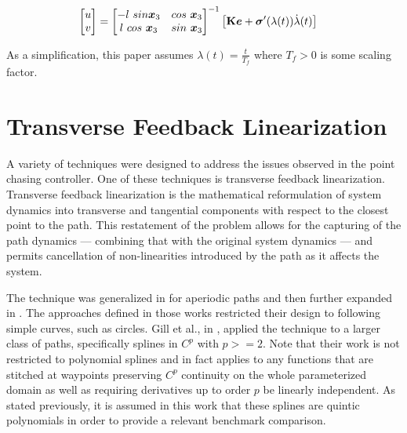 \documentclass[oneside, 11pt]{book}
\begin{document}
\begin{align*}
    \begin{bmatrix}
        u \\ v
    \end{bmatrix}   &=  \begin{bmatrix}
                            -l~sin\bm{x}_3 & cos~\bm{x}_3 \\
                            l~cos~\bm{x}_3 & sin~\bm{x}_3 \\
                        \end{bmatrix}^{-1}
                        \left[
                            \mathbf{K}\bm{e} + \bm{\sigma}'(\lambda(t))\dot{\lambda}(t)
                        \right]
\end{align*}

As a simplification, this paper assumes $\lambda(t)=\frac{t}{T_f}$ where $T_f > 0$ is some scaling factor.

\section{Transverse Feedback Linearization}
A variety of techniques were designed to address the issues observed in the point chasing controller. One of these techniques is transverse feedback linearization. Transverse feedback linearization is the mathematical reformulation of system dynamics into transverse and tangential components with respect to the closest point to the path. This restatement of the problem allows for the capturing of the path dynamics --- combining that with the original system dynamics --- and permits cancellation of non-linearities introduced by the path as it affects the system.

The technique was generalized in \cite{Nielsen06} for aperiodic paths and then further expanded in \cite{Hladio13}. The approaches defined in those works restricted their design to following simple curves, such as circles. Gill et al., in \cite{Gill15}, applied the technique to a larger class of paths, specifically splines in $C^p$ with $p>=2$. Note that their work is not restricted to polynomial splines and in fact applies to any functions that are stitched at waypoints preserving $C^p$ continuity on the whole parameterized domain as well as requiring derivatives up to order $p$ be linearly independent. As stated previously, it is assumed in this work that these splines are quintic polynomials in order to provide a relevant benchmark comparison.
\end{document}
